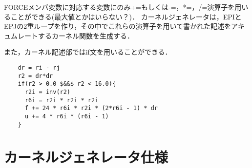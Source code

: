 \documentclass{article}
\begin{document}
FORCEメンバ変数に対応する変数にのみ+=もしくは-=，*=，/=演算子を用いることができる(最大値とかはいらない？)．
カーネルジェネレータは，EPIとEPJの2重ループを作り，その中でこれらの演算子を用いて書かれた記述をアキュムレートするカーネル関数を生成する．

また，カーネル記述部ではif文を用いることができる．
\begin{verbatim}
	dr = ri - rj
	r2 = dr*dr
	if(r2 > 0.0 $&&$ r2 < 16.0){
	  r2i = inv(r2)
	  r6i = r2i * r2i * r2i
	  f += 24 * r6i * r2i * (2*r6i - 1) * dr
	  u += 4 * r6i * (r6i - 1)
	}
\end{verbatim}

\section{カーネルジェネレータ仕様}
\end{document}
